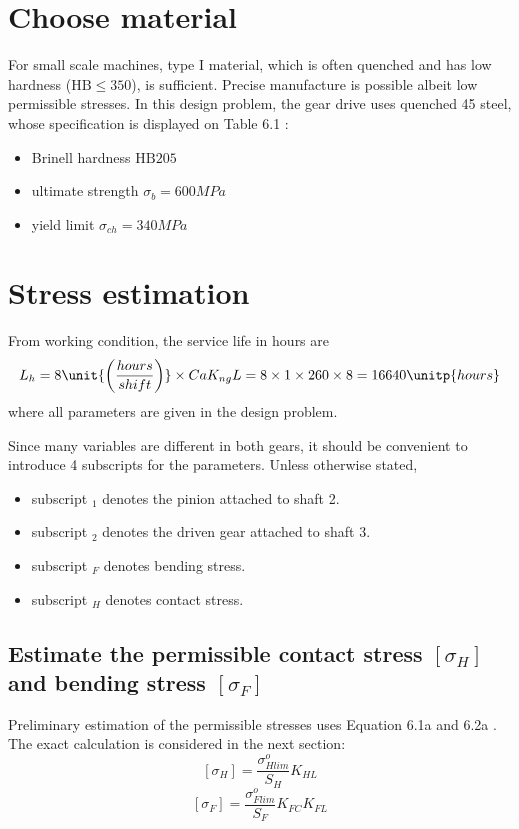 \section{Choose material}
For small scale machines, type I material, which is often quenched and has low hardness ($ \text{HB}\leq 350 $), is sufficient. Precise manufacture is possible albeit low permissible stresses. In this design problem, the gear drive uses quenched 45 steel, whose specification is displayed on Table 6.1 \cite{tk1}:
\begin{itemize}
	\item Brinell hardness $ \text{HB} 205 $
	\item ultimate strength $ \sigma_b = 600\unit{MPa} $
	\item yield limit $ \sigma_{ch} = 340 \unit{MPa}$
\end{itemize}

\section{Stress estimation}
From working condition, the service life in hours are
\[L_h = 8\unit{\left( \dfrac{hours}{shift}\right)}\times Ca  K_{ng} L= 8 \times 1\times 260\times 8 = 16640\unitp{hours}\]
where all parameters are given in the design problem.

Since many variables are different in both gears, it should be convenient to introduce 4 subscripts for the parameters. Unless otherwise stated,
\begin{itemize}
	\item subscript $ _1 $ denotes the pinion attached to shaft 2.
	\item subscript $ _2 $ denotes the driven gear attached to shaft 3.
	\item subscript $ _F $ denotes bending stress.
	\item subscript $ _H $ denotes contact stress.
\end{itemize}
\subsection{Estimate the permissible contact stress $ [\sigma_H] $ and bending stress $ [\sigma_F] $}
Preliminary estimation of the permissible stresses uses Equation 6.1a and 6.2a \cite{tk1}. The exact calculation is considered in the next section:
\[[\sigma_H]=\dfrac{\sigma_{Hlim}^o}{S_H}K_{HL}\]
\[[\sigma_F]=\dfrac{\sigma_{Flim}^o}{S_F}K_{FC}K_{FL}\]


